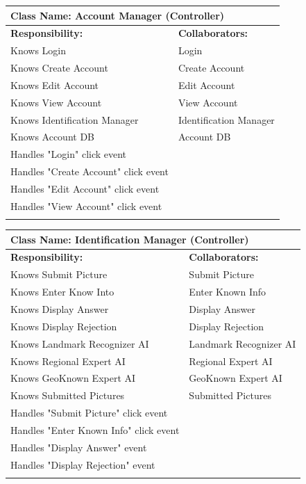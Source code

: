 \documentclass[]{article}
\begin{document}
	\begin{table}[H]
		\centering
		\begin{tabular}{|p{8cm}|p{8cm}|}
		\hline 
		 \multicolumn{2}{|l|}{\textbf{Class Name:} Account Manager (Controller)} \\
		\hline
		\textbf{Responsibility:} & \textbf{Collaborators:} \\
		\hline
            Knows Login & Login \\
            Knows Create Account & Create Account \\
            Knows Edit Account & Edit Account \\
            Knows View Account & View Account \\
            Knows Identification Manager & Identification Manager \\
            Knows Account DB & Account DB \\
            Handles "Login" click event & \\
            Handles "Create Account" click event & \\
            Handles "Edit Account" click event & \\
            Handles "View Account" click event & \\
		\vspace{1cm} & \\
		\hline
		\end{tabular}
	\end{table}

	\begin{table}[H]
		\centering
		\begin{tabular}{|p{8cm}|p{8cm}|}
		\hline 
		 \multicolumn{2}{|l|}{\textbf{Class Name:} Identification Manager (Controller)} \\
		\hline
		\textbf{Responsibility:} & \textbf{Collaborators:} \\
		\hline
            Knows Submit Picture & Submit Picture \\
            Knows Enter Know Into & Enter Known Info \\
            Knows Display Answer & Display Answer \\
            Knows Display Rejection & Display Rejection \\
            Knows Landmark Recognizer AI & Landmark Recognizer AI \\
            Knows Regional Expert AI & Regional Expert AI \\
            Knows GeoKnown Expert AI & GeoKnown Expert AI \\
            Knows Submitted Pictures & Submitted Pictures \\
            Handles "Submit Picture" click event & \\
            Handles "Enter Known Info" click event & \\
            Handles "Display Answer" event & \\
            Handles "Display Rejection" event & \\
		\vspace{1cm} & \\
		\hline
		\end{tabular}
	\end{table}
\end{document}
